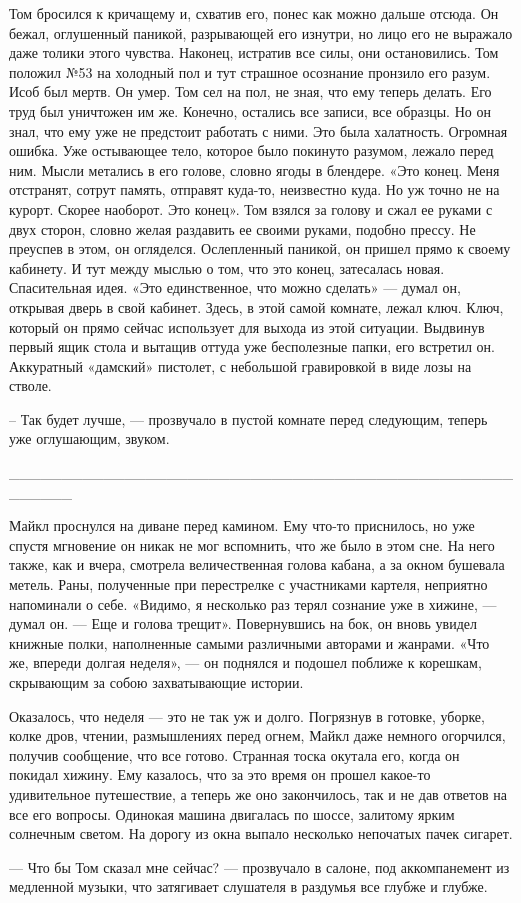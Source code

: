 Том бросился к кричащему и, схватив его, понес как можно дальше отсюда. Он бежал, оглушенный паникой, разрывающей его изнутри, но лицо его не выражало даже толики этого чувства. Наконец, истратив все силы, они остановились. Том положил №53 на холодный пол и тут страшное осознание пронзило его разум. Исоб был мертв. Он умер. Том сел на пол, не зная, что ему теперь делать. Его труд был уничтожен им же. Конечно, остались все записи, все образцы. Но он знал, что ему уже не предстоит работать с ними. Это была халатность. Огромная ошибка. Уже остывающее тело, которое было покинуто разумом, лежало перед ним. Мысли метались в его голове, словно ягоды в блендере. «Это конец. Меня отстранят, сотрут память, отправят куда-то, неизвестно куда. Но уж точно не на курорт. Скорее наоборот. Это конец». Том взялся за голову и сжал ее руками с двух сторон, словно желая раздавить ее своими руками, подобно прессу. Не преуспев в этом, он огляделся. Ослепленный паникой, он пришел прямо к своему кабинету. И тут между мыслью о том, что это конец, затесалась новая. Спасительная идея. «Это единственное, что можно сделать» — думал он, открывая дверь в свой кабинет. Здесь, в этой самой комнате, лежал ключ. Ключ, который он прямо сейчас использует для выхода из этой ситуации. Выдвинув первый ящик стола и вытащив оттуда уже бесполезные папки, его встретил он. Аккуратный «дамский» пистолет, с небольшой гравировкой в виде лозы на стволе.

– Так будет лучше, — прозвучало в пустой комнате перед следующим, теперь уже оглушающим, звуком.

______________________________________________________

Майкл проснулся на диване перед камином. Ему что-то приснилось, но уже спустя мгновение он никак не мог вспомнить, что же было в этом сне. На него также, как и вчера, смотрела величественная голова кабана, а за окном бушевала метель. Раны, полученные при перестрелке с участниками картеля, неприятно напоминали о себе. «Видимо, я несколько раз терял сознание уже в хижине, — думал он. — Еще и голова трещит». Повернувшись на бок, он вновь увидел книжные полки, наполненные самыми различными авторами и жанрами. «Что же, впереди долгая неделя», — он поднялся и подошел поближе к корешкам, скрывающим за собою захватывающие истории.

Оказалось, что неделя — это не так уж и долго. Погрязнув в готовке, уборке, колке дров, чтении, размышлениях перед огнем, Майкл даже немного огорчился, получив сообщение, что все готово. Странная тоска окутала его, когда он покидал хижину. Ему казалось, что за это время он прошел какое-то удивительное путешествие, а теперь же оно закончилось, так и не дав ответов на все его вопросы. Одинокая машина двигалась по шоссе, залитому ярким солнечным светом. На дорогу из окна выпало несколько непочатых пачек сигарет.

— Что бы Том сказал мне сейчас? — прозвучало в салоне, под аккомпанемент из медленной музыки, что затягивает слушателя в раздумья все глубже и глубже.
